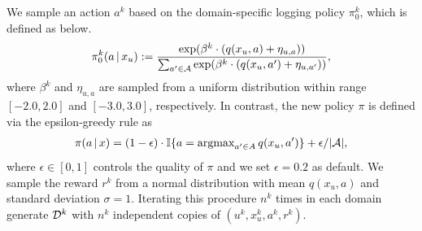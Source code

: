 \documentclass{article} %
\theoremstyle{definition}
\begin{document}
We sample an action $a^{k}$ based on the domain-specific logging policy $\pi_0^{k}$, which is defined as below.
\begin{align}
\label{logging policy}
    \pi_0^{k}(a\,|\,x_u):=\frac{\mathrm{exp}(\beta^{k}\cdot (q(x_u,a)+\eta_{u,a}))}{\sum_{a'\in \mathcal{A}}\mathrm{exp}(\beta^{k}\cdot (q(x_u,a')+\eta_{u,a'}))},
\end{align}
where $\beta^{k}$ and $\eta_{u,a}$ are sampled from a uniform distribution within range $[-2.0,2.0]$ and $[-3.0,3.0]$, respectively. 
In contrast, the new policy $\pi$ is defined via the epsilon-greedy rule as
\begin{align}
    \pi(a\,|\,x)= (1-\epsilon) \cdot \mathbb{I} \{ a= \mathrm{argmax}_{a'\in A} \, q(x_u,a')\}+ \epsilon / |\mathcal{A}|, \label{eq:eval-policy}
\end{align}
where $\epsilon \in [0, 1]$ controls the quality of $\pi$ and we set $\epsilon = 0.2$ as default. We sample the reward $r^{k}$ from a normal distribution with mean $q(x_u, a)$ and standard deviation $\sigma = 1$. Iterating this procedure $n^{k}$ times in each domain generate $\mathcal{D}^{k}$ with $n^{k}$ independent copies of $(u^{k}, x^{k}_u, a^{k}, r^{k})$.
\end{document}
